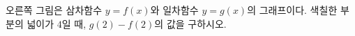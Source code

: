 \noindent\begin{minipage}[t]{0.58\linewidth}\vspace{0pt}\raggedright 오른쪽 그림은 삼차함수 $y=f(x)$와 일차함수 $y=g(x)$의 그래프이다. 색칠한 부분의 넓이가 $4$일 때, $g(2)-f(2)$의 값을 구하시오.\end{minipage}\hfill\begin{minipage}[t]{0.4\linewidth}\vspace{0pt}\centering \resizebox{\ifdim\width>\linewidth\linewidth\else\width\fi}{!}{}\end{minipage}\par
